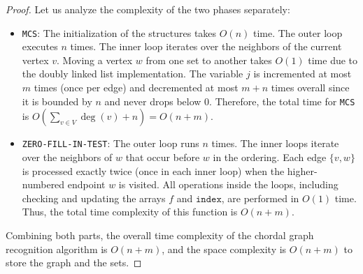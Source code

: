 \begin{proof}
Let us analyze the complexity of the two phases separately:
\begin{itemize}
    \item \texttt{MCS}: The initialization of the structures takes $O(n)$ time. The outer loop executes $n$ times. The inner loop iterates over the neighbors of the current vertex $v$. Moving a vertex $w$ from one set to another takes $O(1)$ time due to the doubly linked list implementation. The variable $j$ is incremented at most $m$ times (once per edge) and decremented at most $m + n$ times overall since it is bounded by $n$ and never drops below $0$. Therefore, the total time for \texttt{MCS} is $O(\sum_{v \in V} \deg(v) + n) = O(n + m)$.
    \item \texttt{ZERO-FILL-IN-TEST}: The outer loop runs $n$ times. The inner loops iterate over the neighbors of $w$ that occur before $w$ in the ordering. Each edge $\{v, w\}$ is processed exactly twice (once in each inner loop) when the higher-numbered endpoint $w$ is visited. All operations inside the loops, including checking and updating the arrays $f$ and $\texttt{index}$, are performed in $O(1)$ time. Thus, the total time complexity of this function is $O(n + m)$.
\end{itemize}
Combining both parts, the overall time complexity of the chordal graph recognition algorithm is $O(n + m)$, and the space complexity is $O(n + m)$ to store the graph and the sets.
\end{proof}